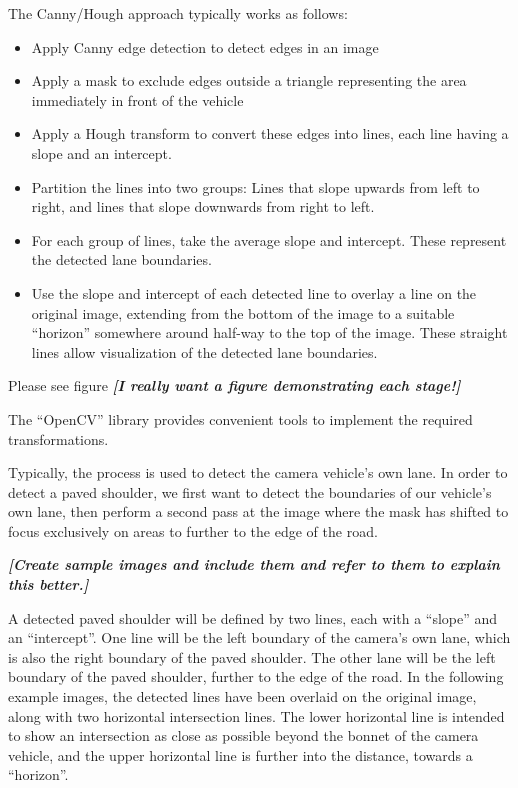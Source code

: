 \documentclass[11pt,twoside]{report}
\newcommand{\remark}[1]{{\bf \em [\marginpar{$\Leftarrow$}#1]}}
\begin{document}
The Canny/Hough approach typically works as follows:

\begin{itemize}
\item{Apply Canny edge detection to detect edges in an image \cite{canny}}
\item{Apply a mask to exclude edges outside a triangle representing the area immediately in front of the vehicle}
\item{Apply a Hough transform \cite{hough} to convert these edges into lines, each line having a slope and an intercept.}
\item{Partition the lines into two groups:  Lines that slope upwards from left to right, and lines that slope downwards from right to left.}
\item{For each group of lines, take the average slope and intercept.  These represent the detected lane boundaries.}
\item{Use the slope and intercept of each detected line to overlay a line on the original image, extending from the bottom of the image to a suitable ``horizon'' somewhere around half-way to the top of the image.  These straight lines allow visualization of the detected lane boundaries.}
\end{itemize}

Please see figure \remark{I really want a figure demonstrating each stage!}

The ``OpenCV'' library provides convenient tools to implement the required transformations.

Typically, the process is used to detect the camera vehicle's own lane.  In order to detect a paved shoulder, we first want to detect the boundaries of our vehicle's own lane, then perform a second pass at the image where the mask has shifted to focus exclusively on areas to further to the edge of the road.

\remark{Create sample images and include them and refer to them to explain this better.}

A detected paved shoulder will be defined by two lines, each with a ``slope'' and an ``intercept''.  One line will be the left boundary of the camera's own lane, which is also the right boundary of the paved shoulder.  The other lane will be the left boundary of the paved shoulder, further to the edge of the road.  In the following example images, the detected lines have been overlaid  on the original image, along with two horizontal intersection lines.  The lower horizontal line is intended to show an intersection as close as possible beyond the bonnet of the camera vehicle, and the upper horizontal line is further into the distance, towards a ``horizon''.
\end{document}
